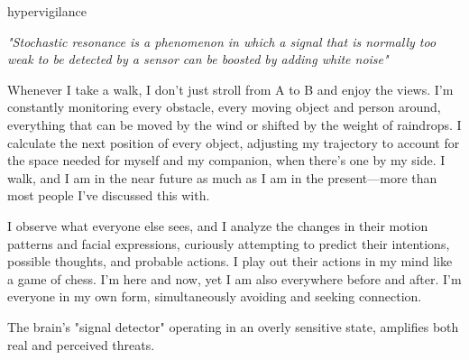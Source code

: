 



\begin{center}
\vspace*{\fill}
\Huge{hypervigilance}

\vspace{2cm}

\begin{flushright}
\large{
\textit{"Stochastic resonance is a phenomenon in which a signal that is normally too weak to be detected by a sensor can be boosted by adding white noise"}}
\end{flushright}

\vspace*{\fill}
\end{center}

Whenever I take a walk, I don't just stroll from A to B and enjoy the views. I'm constantly monitoring every obstacle, every moving object and person around, everything that can be moved by the wind or shifted by the weight of raindrops. I calculate the next position of every object, adjusting my trajectory to account for the space needed for myself and my companion, when there's one by my side. I walk, and I am in the near future as much as I am in the present—more than most people I've discussed this with.

I observe what everyone else sees, and I analyze the changes in their motion patterns and facial expressions, curiously attempting to predict their intentions, possible thoughts, and probable actions. I play out their actions in my mind like a game of chess. I'm here and now, yet I am also everywhere before and after. I'm everyone in my own form, simultaneously avoiding and seeking connection.

The brain’s "signal detector" operating in an overly sensitive state, amplifies both real and perceived threats.
